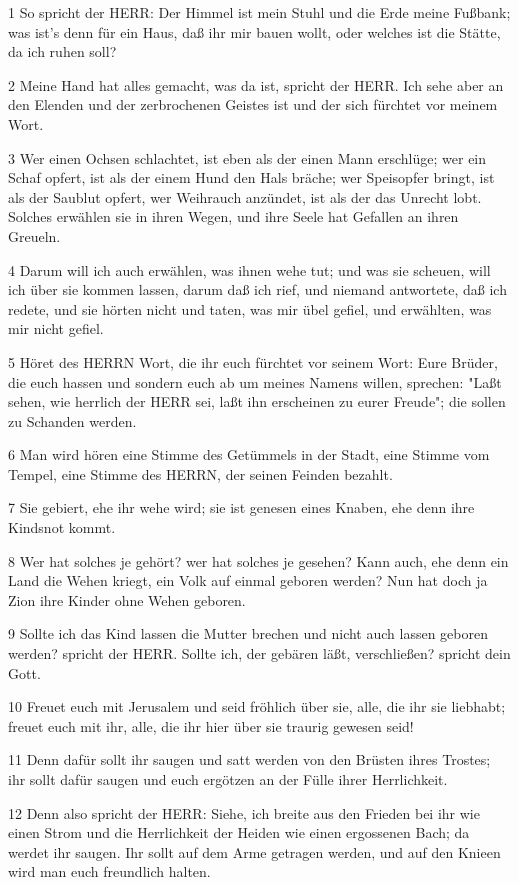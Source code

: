 \par 1 So spricht der HERR: Der Himmel ist mein Stuhl und die Erde meine Fußbank; was ist's denn für ein Haus, daß ihr mir bauen wollt, oder welches ist die Stätte, da ich ruhen soll?
\par 2 Meine Hand hat alles gemacht, was da ist, spricht der HERR. Ich sehe aber an den Elenden und der zerbrochenen Geistes ist und der sich fürchtet vor meinem Wort.
\par 3 Wer einen Ochsen schlachtet, ist eben als der einen Mann erschlüge; wer ein Schaf opfert, ist als der einem Hund den Hals bräche; wer Speisopfer bringt, ist als der Saublut opfert, wer Weihrauch anzündet, ist als der das Unrecht lobt. Solches erwählen sie in ihren Wegen, und ihre Seele hat Gefallen an ihren Greueln.
\par 4 Darum will ich auch erwählen, was ihnen wehe tut; und was sie scheuen, will ich über sie kommen lassen, darum daß ich rief, und niemand antwortete, daß ich redete, und sie hörten nicht und taten, was mir übel gefiel, und erwählten, was mir nicht gefiel.
\par 5 Höret des HERRN Wort, die ihr euch fürchtet vor seinem Wort: Eure Brüder, die euch hassen und sondern euch ab um meines Namens willen, sprechen: "Laßt sehen, wie herrlich der HERR sei, laßt ihn erscheinen zu eurer Freude"; die sollen zu Schanden werden.
\par 6 Man wird hören eine Stimme des Getümmels in der Stadt, eine Stimme vom Tempel, eine Stimme des HERRN, der seinen Feinden bezahlt.
\par 7 Sie gebiert, ehe ihr wehe wird; sie ist genesen eines Knaben, ehe denn ihre Kindsnot kommt.
\par 8 Wer hat solches je gehört? wer hat solches je gesehen? Kann auch, ehe denn ein Land die Wehen kriegt, ein Volk auf einmal geboren werden? Nun hat doch ja Zion ihre Kinder ohne Wehen geboren.
\par 9 Sollte ich das Kind lassen die Mutter brechen und nicht auch lassen geboren werden? spricht der HERR. Sollte ich, der gebären läßt, verschließen? spricht dein Gott.
\par 10 Freuet euch mit Jerusalem und seid fröhlich über sie, alle, die ihr sie liebhabt; freuet euch mit ihr, alle, die ihr hier über sie traurig gewesen seid!
\par 11 Denn dafür sollt ihr saugen und satt werden von den Brüsten ihres Trostes; ihr sollt dafür saugen und euch ergötzen an der Fülle ihrer Herrlichkeit.
\par 12 Denn also spricht der HERR: Siehe, ich breite aus den Frieden bei ihr wie einen Strom und die Herrlichkeit der Heiden wie einen ergossenen Bach; da werdet ihr saugen. Ihr sollt auf dem Arme getragen werden, und auf den Knieen wird man euch freundlich halten.
